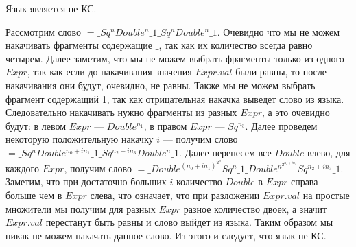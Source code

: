\documentclass[a4paper, 14pt]{extarticle}
\begin{document}
Язык является не КС.

Рассмотрим слово $=\_Sq^nDouble^n\_1\_Sq^nDouble^n\_1$. Очевидно что мы не можем накачивать фрагменты содержащие $\_$, так как их количество всегда равно четырем. Далее заметим, что мы не можем выбрать фрагменты только из одного $Expr$, так как если до накачивания значения $Expr.val$ были равны, то после накачивания они будут, очевидно, не равны. Также мы не можем выбрать фрагмент содержащий 1, так как отрицательная накачка выведет слово из языка. Следовательно накачивать нужно фрагменты из разных $Expr$, а это очевидно будут: в левом $Expr$ --- $Double^{n_1}$, в правом $Expr$ --- $Sq^{n_3}$. Далее проведем некоторую положительную накачку $i$ ---  получим слово $=\_Sq^nDouble^{n_0 + in_1}\_1\_Sq^{n_2 + in_3}Double^n\_1$. Далее перенесем все $Double$ влево, для каждого $Expr$, получим слово $=\_Double^{(n_0 + in_1)^{2^n}}Sq^n\_1\_Double^{n^{2^{n_2 + in_3}}}Sq^{n_2 + in_3}\_1$. Заметим, что при достаточно больших $i$ количество $Double$ в $Expr$ справа больше чем в $Expr$ слева, что означает, что при разложении $Expr.val$ на простые множители мы получим для разных $Expr$ разное количество двоек, а значит $Expr.val$ перестанут быть равны и слово выйдет из языка. Таким образом мы никак не можем накачать данное слово. Из этого и следует, что язык не КС.
\end{document}
